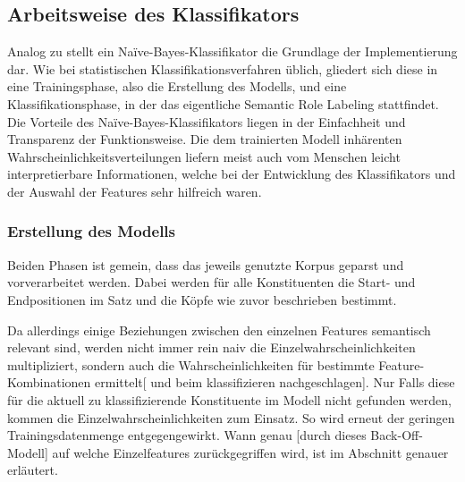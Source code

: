 \documentclass[12pt]{article}
\begin{document}
\subsection{Arbeitsweise des Klassifikators}

Analog zu \cite{gildea} stellt ein Naïve-Bayes-Klassifikator die Grundlage der Implementierung dar. Wie bei statistischen Klassifikationsverfahren üblich, gliedert sich diese in eine Trainingsphase, also die Erstellung des Modells, und eine Klassifikationsphase, in der das eigentliche Semantic Role Labeling stattfindet. Die Vorteile des Naïve-Bayes-Klassifikators liegen in der Einfachheit und Transparenz der Funktionsweise. Die dem trainierten Modell inhärenten Wahrscheinlichkeitsverteilungen liefern meist auch vom Menschen leicht interpretierbare Informationen, welche bei der Entwicklung des Klassifikators und der Auswahl der Features sehr hilfreich waren. 




\subsubsection*{Erstellung des Modells}

Beiden Phasen ist gemein, dass das jeweils genutzte Korpus geparst und vorverarbeitet werden. Dabei werden für alle Konstituenten die Start- und Endpositionen im Satz und die Köpfe wie zuvor beschrieben bestimmt.


Da allerdings einige Beziehungen zwischen den einzelnen Features semantisch relevant sind, werden nicht immer rein naiv die Einzelwahrscheinlichkeiten multipliziert, sondern auch die Wahrscheinlichkeiten für bestimmte Feature-Kombinationen ermittelt[ und beim klassifizieren nachgeschlagen]. Nur Falls diese für die aktuell zu klassifizierende Konstituente im Modell nicht gefunden werden, kommen die Einzelwahrscheinlichkeiten zum Einsatz. So wird erneut der geringen Trainingsdatenmenge entgegengewirkt. Wann genau [durch dieses Back-Off-Modell] auf welche Einzelfeatures zurückgegriffen wird, ist im Abschnitt  genauer erläutert.
\end{document}
